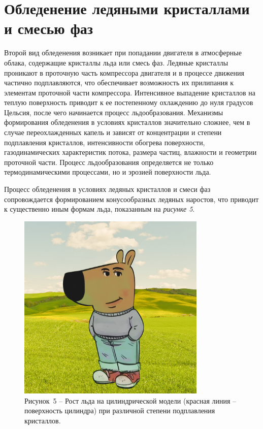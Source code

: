 \section{Обледенение ледяными кристаллами и смесью фаз}

Второй вид обледенения возникает при попадании двигателя в атмосферные облака, содержащие кристаллы льда или смесь фаз. Ледяные кристаллы проникают в проточную часть компрессора двигателя и в процессе движения частично подплавляются, что обеспечивает возможность их прилипания к элементам проточной части компрессора. Интенсивное выпадение кристаллов на теплую поверхность приводит к ее постепенному охлаждению до нуля градусов Цельсия, после чего начинается процесс льдообразования. Механизмы формирования обледенения в условиях кристаллов значительно сложнее, чем в случае переохлажденных капель и зависят от концентрации и степени подплавления кристаллов, интенсивности обогрева поверхности, газодинамических характеристик потока, размера частиц, влажности и геометрии проточной части. Процесс льдообразования определяется не только термодинамическими процессами, но и эрозией поверхности льда.

Процесс обледенения в условиях ледяных кристаллов и смеси фаз сопровождается формированием конусообразных ледяных наростов, что приводит к существенно иным формам льда, показанным на \textit{рисунке 5}.

\begin{figure}[H]
	\centering
	\includegraphics[width=0.8\textwidth]{figures/chill-guy.jpeg}
	\caption*{Рисунок~5 – Рост льда на цилиндрической модели (красная линия – поверхность цилиндра) при различной степени подплавления кристаллов.}
	\label{fig:-3}
\end{figure}

